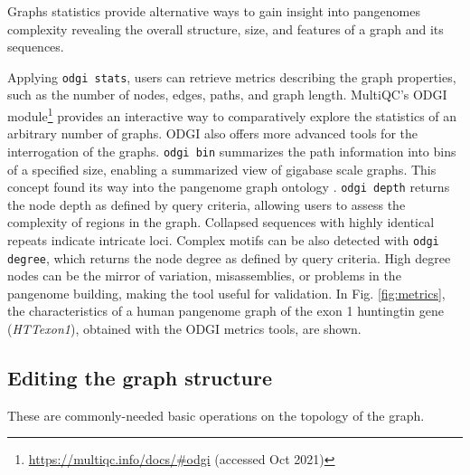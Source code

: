 \documentclass{bioinfo}
\begin{document}




Graphs statistics provide alternative ways to gain insight into pangenomes complexity revealing the overall structure, size, and features of a graph and its sequences. 

Applying \texttt{odgi stats}, users can retrieve metrics describing the graph properties, such as the number of nodes, edges, paths, and graph length. MultiQC's \citep{Ewels_2016} ODGI module\footnote{\url{https://multiqc.info/docs/\#odgi} (accessed Oct 2021)} provides an interactive way to comparatively explore the statistics of an arbitrary number of graphs. ODGI also offers more advanced tools for the interrogation of the graphs. \texttt{odgi bin} summarizes the path information into bins of a specified size, enabling a summarized view of gigabase scale graphs. This concept found its way into the pangenome graph ontology \cite{Yokoyama2020}. \texttt{odgi depth} returns the node depth as defined by query criteria, allowing users to assess the complexity of regions in the graph. Collapsed sequences with highly identical repeats indicate intricate loci. Complex motifs can be also detected with \texttt{odgi degree}, which returns the node degree as defined by query criteria. High degree nodes can be the mirror of variation, misassemblies, or problems in the pangenome building, making the tool useful for validation. In Fig. \ref{fig:metrics}, the characteristics of a human pangenome graph of the exon 1 huntingtin gene \citep{Sathasivam2013,Neueder2017} (\textit{HTTexon1}), obtained with the ODGI metrics tools, are shown.




\subsection{Editing the graph structure}


These are commonly-needed basic operations on the topology of the graph.
\end{document}
